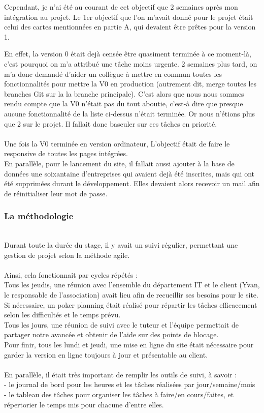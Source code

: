 Cependant, je n'ai été au courant de cet objectif que 2 semaines après mon intégration au projet. 
Le 1er objectif que l'on m'avait donné pour le projet était celui des cartes mentionnées en partie A, qui devaient être prêtes pour la version 1. 

En effet, la version 0 était dejà censée être quasiment terminée à ce moment-là, c'est pourquoi on m'a attribué une tâche moins urgente. 
2 semaines plus tard, on m'a donc demandé d'aider un collègue à mettre en commun toutes les fonctionnalités pour mettre la V0 en production 
(autrement dit, merge toutes les branches Git sur la la branche principale).
C'est alors que nous nous sommes rendu compte que la V0 n'était pas du tout aboutie, c'est-à dire que presque aucune fonctionnalité de la liste ci-dessus n'était terminée. 
Or nous n'étions plus que 2 sur le projet. Il fallait donc basculer sur ces tâches en priorité.
\\\\
Une fois la V0 terminée en version ordinateur, L'objectif était de faire le responsive de toutes les pages intégrées. 
\\
En parallèle, pour le lancement du site, il fallait aussi ajouter à la base de données une soixantaine d'entreprises qui avaient dejà été inscrites, mais qui ont été supprimées durant le développement.
Elles devaient alors recevoir un mail afin de réinitialiser leur mot de passe.\\

\pagebreak

\subsubsection{La méthodologie}
~\\
Durant toute la durée du stage, il y avait un suivi régulier, permettant une gestion de projet selon la méthode agile.
\\\\
Ainsi, cela fonctionnait par cycles répétés : 
\\
Tous les jeudis, une réunion avec l'ensemble du département IT et le client (Yvan, le responsable de l'association) avait lieu afin de recueillir ses besoins pour le site.\\
Si nécessaire, un poker planning était réalisé pour répartir les tâches efficacement selon les difficultés et le temps prévu. 
\\Tous les jours, une réunion de suivi avec le tuteur et l'équipe permettait de partager notre avancée et obtenir de l'aide sur des points de blocage.
\\Pour finir, tous les lundi et jeudi, une mise en ligne du site était nécessaire pour garder la version en ligne toujours à jour et présentable au client.
\\\\En parallèle, il était très important de remplir les outils de suivi, à savoir : \\
- le journal de bord pour les heures et les tâches réalisées par jour/semaine/mois\\ 
- le tableau des tâches pour organiser les tâches à faire/en cours/faites, et répertorier le temps mis pour chacune d'entre elles.\\

